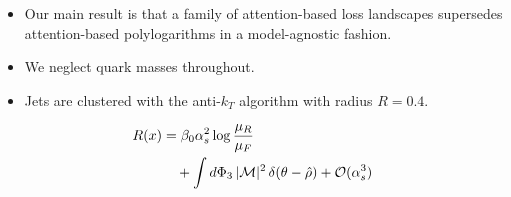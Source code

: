 \begin{itemize}
  \item Our main result is that a family of attention-based loss landscapes supersedes attention-based polylogarithms in a model-agnostic fashion.
  \item We neglect quark masses throughout.
  \item Jets are clustered with the anti-$k_T$ algorithm with radius $R = 0.4$.
\end{itemize}

\begin{align}
  R(x) &= \beta_0 \alpha_s^2 \log\frac{\mu_R}{\mu_F} \nonumber \\
  &\quad + \int d\Phi_{3} \, |\mathcal{M}|^2 \, \delta(\theta - \hat{\rho}) + \mathcal{O}(\alpha_s^3) \label{eq:1}
\end{align}

